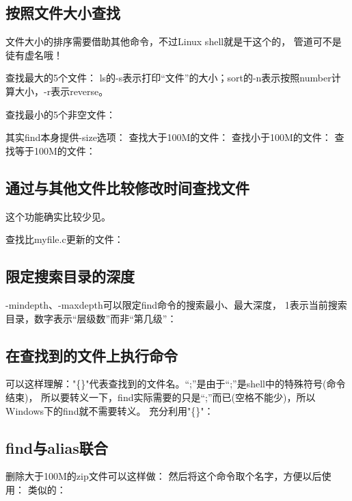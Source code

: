 \documentclass[a4paper,11pt]{article}
\begin{document}
  \subsection[按照文件大小查找]{按照文件大小查找}
  文件大小的排序需要借助其他命令，不过Linux shell就是干这个的，
  管道可不是徒有虚名哦！

  查找最大的5个文件：
  ls的-s表示打印“文件”的大小；sort的-n表示按照number计算大小，-r表示reverse。

  查找最小的5个非空文件：

  其实find本身提供-size选项：
  查找大于100M的文件：
  查找小于100M的文件：
  查找等于100M的文件：

  \subsection[通过与其他文件比较修改时间查找文件]{通过与其他文件比较修改时间查找文件}
  这个功能确实比较少见。

  查找比myfile.c更新的文件：


  \subsection[限定搜索目录的深度]{限定搜索目录的深度}
  -mindepth、-maxdepth可以限定find命令的搜索最小、最大深度，
  1表示当前搜索目录，数字表示“层级数”而非“第几级”：

  \subsection[在查找到的文件上执行命令]{在查找到的文件上执行命令}
  可以这样理解："\{\}"代表查找到的文件名。“\bs;”是由于“;”是shell中的特殊符号(命令结束)，
  所以要转义一下，find实际需要的只是“\textvisiblespace ;”而已(空格不能少)，所以Windows下的find就不需要转义。
  充分利用"\{\}"：

  \subsection[find与alias联合]{find与alias联合}
  删除大于100M的zip文件可以这样做：
  然后将这个命令取个名字，方便以后使用：
  类似的：
\end{document}
